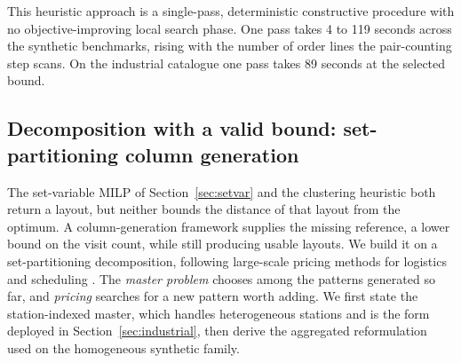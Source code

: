 \documentclass[]{interact}
\begin{document}
This heuristic approach is a single-pass, deterministic constructive procedure with no objective-improving local search phase. One pass takes 4 to 119 seconds across the synthetic benchmarks, rising with the number of order lines the pair-counting step scans. On the industrial catalogue one pass takes 89 seconds at the selected bound.


\subsection{Decomposition with a valid bound: set-partitioning column generation}\label{sec:cg}
The set-variable MILP of Section~\ref{sec:setvar} and the clustering heuristic both return a layout, but neither bounds the distance of that layout from the optimum. A column-generation framework supplies the missing reference, a lower bound on the visit count, while still producing usable layouts. We build it on a set-partitioning decomposition, following large-scale pricing methods for logistics and scheduling \citep{lubbecke2005selected, desrochers1989column, muter2022}. The \emph{master problem} chooses among the patterns generated so far, and \emph{pricing} searches for a new pattern worth adding. We first state the station-indexed master, which handles heterogeneous stations and is the form deployed in Section~\ref{sec:industrial}, then derive the aggregated reformulation used on the homogeneous synthetic family.
\end{document}
